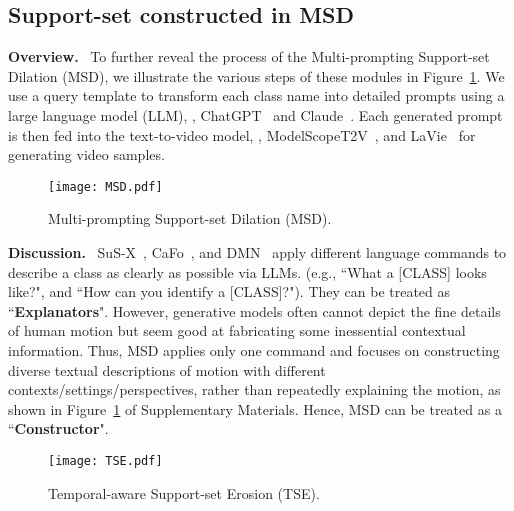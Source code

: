{
\subsection{Support-set constructed in MSD}
\noindent\textbf{Overview.}~{
To further reveal the process of the Multi-prompting Support-set Dilation (MSD), we illustrate the various steps of these modules in Figure~\ref{fig::MSD}. We use a query template to transform each class name into detailed prompts using a large language model (LLM), \eg, ChatGPT~\cite{ChatGPT} and Claude~\cite{Claude3}. Each generated prompt is then fed into the text-to-video model, \eg, ModelScopeT2V~\cite{wang2023modelscopetexttovideotechnicalreport}, and LaVie~\cite{wang2023laviehighqualityvideogeneration} for generating video samples. 
}


\begin{figure}[!ht]
  \centering
  \texttt{[image: MSD.pdf]}
  \caption{Multi-prompting Support-set Dilation (MSD).}\label{fig::MSD}
\end{figure}


\noindent\textbf{Discussion.}~{
SuS-X~\cite{udandarao2022sus-x}, CaFo~\cite{zhang2023prompt}, and DMN~\cite{zhang2024dual} apply different language commands to describe a class as clearly as possible via LLMs. (e.g., ``What a [CLASS] looks like?", and ``How can you identify a [CLASS]?"). They can be treated as ``\textbf{Explanators}". However, generative models often cannot depict the fine details of human motion but seem good at fabricating some inessential contextual information. Thus, MSD applies only one command and focuses on constructing diverse textual descriptions of motion with different contexts/settings/perspectives, rather than repeatedly explaining the motion, as shown in Figure~\ref{fig::MSD} of Supplementary Materials. Hence, MSD can be treated as a ``\textbf{Constructor}".
}


\begin{figure}[!htbp]
  \centering
  \texttt{[image: TSE.pdf]}
  \caption{Temporal-aware Support-set Erosion (TSE).}\label{fig::TSE}
\end{figure}

}
